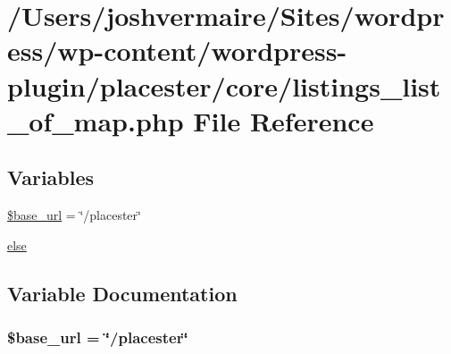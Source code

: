 \hypertarget{listings__list__of__map_8php}{
\section{/Users/joshvermaire/Sites/wordpress/wp-\/content/wordpress-\/plugin/placester/core/listings\_\-list\_\-of\_\-map.php File Reference}
\label{d0/da4/listings__list__of__map_8php}
}
\subsection*{Variables}
\begin{DoxyCompactItemize}
\item 
\hyperlink{listings__list__of__map_8php_a6886427c9c643f707fcb35c018049bc7}{\$base\_\-url} = \char`\"{}/placester\char`\"{}
\item 
\hyperlink{listings__list__of__map_8php_a0544c3fe466e421738dae463968b70ba}{else}
\end{DoxyCompactItemize}


\subsection{Variable Documentation}
\hypertarget{listings__list__of__map_8php_a6886427c9c643f707fcb35c018049bc7}{
\subsubsection[{\$base\_\-url}]{\setlength{\rightskip}{0pt plus 5cm}\$base\_\-url = \char`\"{}/placester\char`\"{}}}
\label{d0/da4/listings__list__of__map_8php_a6886427c9c643f707fcb35c018049bc7}
\hypertarget{listings__list__of__map_8php_a0544c3fe466e421738dae463968b70ba}{
\subsubsection[{else}]{}}
\label{d0/da4/listings__list__of__map_8php_a0544c3fe466e421738dae463968b70ba}

